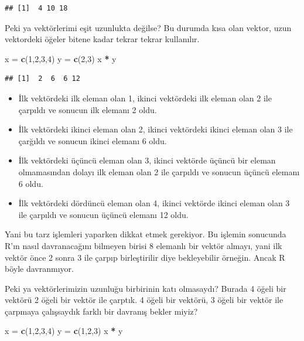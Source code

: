 \documentclass[]{book}
\newenvironment{Shaded}{\begin{snugshade}}{\end{snugshade}}
\newcommand{\DecValTok}[1]{\textcolor[rgb]{0.00,0.00,0.81}{#1}}
\newcommand{\KeywordTok}[1]{\textcolor[rgb]{0.13,0.29,0.53}{\textbf{#1}}}
\newcommand{\NormalTok}[1]{#1}
\newcommand{\OperatorTok}[1]{\textcolor[rgb]{0.81,0.36,0.00}{\textbf{#1}}}
\newcommand{\StringTok}[1]{\textcolor[rgb]{0.31,0.60,0.02}{#1}}
\providecommand{\tightlist}{%
  \setlength{\itemsep}{0pt}\setlength{\parskip}{0pt}}
\begin{document}
\begin{verbatim}
## [1]  4 10 18
\end{verbatim}

Peki ya vektörlerimi eşit uzunlukta değilse? Bu durumda kısa olan
vektor, uzun vektordeki öğeler bitene kadar tekrar tekrar kullanılır.

\begin{Shaded}
\begin{Highlighting}[]
\NormalTok{x =}\StringTok{ }\KeywordTok{c}\NormalTok{(}\DecValTok{1}\NormalTok{,}\DecValTok{2}\NormalTok{,}\DecValTok{3}\NormalTok{,}\DecValTok{4}\NormalTok{)}
\NormalTok{y =}\StringTok{ }\KeywordTok{c}\NormalTok{(}\DecValTok{2}\NormalTok{,}\DecValTok{3}\NormalTok{)}
\NormalTok{x }\OperatorTok{*}\StringTok{ }\NormalTok{y}
\end{Highlighting}
\end{Shaded}

\begin{verbatim}
## [1]  2  6  6 12
\end{verbatim}

\begin{itemize}
\tightlist
\item
  İlk vektördeki ilk eleman olan 1, ikinci vektördeki ilk eleman olan 2
  ile çarpıldı ve sonucun ilk elemanı 2 oldu.
\item
  İlk vektördeki ikinci eleman olan 2, ikinci vektördeki ikinci eleman
  olan 3 ile çarğıldı ve sonucun ikinci elemanı 6 oldu.
\item
  İlk vektördeki üçüncü eleman olan 3, ikinci vektörde üçüncü bir eleman
  olmamasından dolayı ilk eleman olan 2 ile çarpıldı ve sonucun üçüncü
  elemanı 6 oldu.
\item
  İlk vektördeki dördüncü eleman olan 4, ikinci vektörde ikinci eleman
  olan 3 ile çarpıldı ve sonucun üçüncü elemanı 12 oldu.
\end{itemize}

Yani bu tarz işlemleri yaparken dikkat etmek gerekiyor. Bu işlemin
sonucunda R'ın nasıl davranacağını bilmeyen birisi 8 elemanlı bir vektör
almayı, yani ilk vektör önce 2 sonra 3 ile çarpıp birleştirilir diye
bekleyebilir örneğin. Ancak R böyle davranmıyor.

Peki ya vektörlerimizin uzunluğu birbirinin katı olmasaydı? Burada 4
öğeli bir vektörü 2 öğeli bir vektör ile çarptık. 4 öğeli bir vektörü, 3
öğeli bir vektör ile çarpmaya çalışsaydık farklı bir davranış bekler
miyiz?

\begin{Shaded}
\begin{Highlighting}[]
\NormalTok{x =}\StringTok{ }\KeywordTok{c}\NormalTok{(}\DecValTok{1}\NormalTok{,}\DecValTok{2}\NormalTok{,}\DecValTok{3}\NormalTok{,}\DecValTok{4}\NormalTok{)}
\NormalTok{y =}\StringTok{ }\KeywordTok{c}\NormalTok{(}\DecValTok{1}\NormalTok{,}\DecValTok{2}\NormalTok{,}\DecValTok{3}\NormalTok{)}
\NormalTok{x }\OperatorTok{*}\StringTok{ }\NormalTok{y}
\end{Highlighting}
\end{Shaded}
\end{document}
